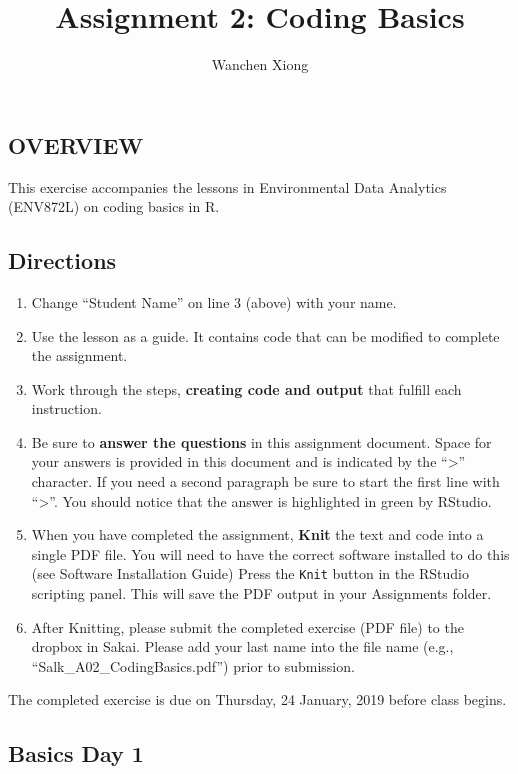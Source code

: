 \documentclass[]{article}
\title{Assignment 2: Coding Basics}
\author{Wanchen Xiong}
\date{}
\providecommand{\tightlist}{%
  \setlength{\itemsep}{0pt}\setlength{\parskip}{0pt}}
\begin{document}
\maketitle

\subsection{OVERVIEW}\label{overview}

This exercise accompanies the lessons in Environmental Data Analytics
(ENV872L) on coding basics in R.

\subsection{Directions}\label{directions}

\begin{enumerate}
\def\labelenumi{\arabic{enumi}.}
\tightlist
\item
  Change ``Student Name'' on line 3 (above) with your name.
\item
  Use the lesson as a guide. It contains code that can be modified to
  complete the assignment.
\item
  Work through the steps, \textbf{creating code and output} that fulfill
  each instruction.
\item
  Be sure to \textbf{answer the questions} in this assignment document.
  Space for your answers is provided in this document and is indicated
  by the ``\textgreater{}'' character. If you need a second paragraph be
  sure to start the first line with ``\textgreater{}''. You should
  notice that the answer is highlighted in green by RStudio.
\item
  When you have completed the assignment, \textbf{Knit} the text and
  code into a single PDF file. You will need to have the correct
  software installed to do this (see Software Installation Guide) Press
  the \texttt{Knit} button in the RStudio scripting panel. This will
  save the PDF output in your Assignments folder.
\item
  After Knitting, please submit the completed exercise (PDF file) to the
  dropbox in Sakai. Please add your last name into the file name (e.g.,
  ``Salk\_A02\_CodingBasics.pdf'') prior to submission.
\end{enumerate}

The completed exercise is due on Thursday, 24 January, 2019 before class
begins.

\subsection{Basics Day 1}\label{basics-day-1}
\end{document}
